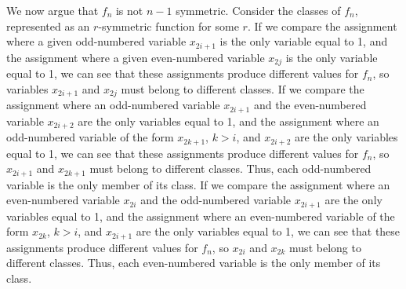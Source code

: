 We now argue that $f_n$ is not $n-1$ symmetric.
Consider the classes of $f_n$, represented as an $r$-symmetric function for some $r$.
If we compare the assignment where a given odd-numbered variable $x_{2i+1}$ is the only variable equal to 1,
and the assignment where a given even-numbered variable $x_{2j}$ is the only variable equal to 1,
we can see that these assignments produce different values for $f_n$,
so variables $x_{2i+1}$ and $x_{2j}$ must belong to different classes.
If we compare the assignment where an odd-numbered variable $x_{2i+1}$  
and the even-numbered variable $x_{2i+2}$ 
are the only variables equal to 1,
and the assignment where an odd-numbered variable of the form $x_{2k+1}$, $k >i$,
and $x_{2i+2}$  are the only variables equal to 1,
we can see that these assignments produce different values for $f_n$,
so $x_{2i+1}$ and $x_{2k+1}$ must belong to different classes.
Thus, each odd-numbered variable is the only member of its class.
If we compare the assignment where an even-numbered variable $x_{2i}$  
and the odd-numbered variable $x_{2i+1}$ 
are the only variables equal to 1,
and the assignment where an even-numbered variable of the form $x_{2k}$, $k >i$,
and $x_{2i+1}$  are the only variables equal to 1,
we can see that these assignments produce different values for $f_n$,
so $x_{2i}$ and $x_{2k}$ must belong to different classes.
Thus, each even-numbered variable is the only member of its class.
\QED

\fi



